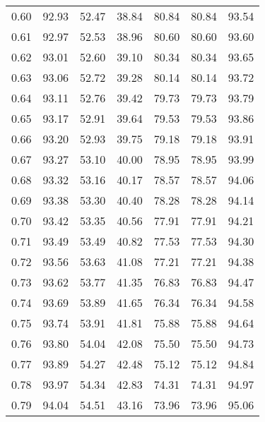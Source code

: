\begin{tabular}{|c|c|c|c|c|c|c|}
      0.60 &     92.93 &     52.47 &      38.84 &   80.84 &      80.84 &         93.54 \\
      0.61 &     92.97 &     52.53 &      38.96 &   80.60 &      80.60 &         93.60 \\
      0.62 &     93.01 &     52.60 &      39.10 &   80.34 &      80.34 &         93.65 \\
      0.63 &     93.06 &     52.72 &      39.28 &   80.14 &      80.14 &         93.72 \\
      0.64 &     93.11 &     52.76 &      39.42 &   79.73 &      79.73 &         93.79 \\
      0.65 &     93.17 &     52.91 &      39.64 &   79.53 &      79.53 &         93.86 \\
      0.66 &     93.20 &     52.93 &      39.75 &   79.18 &      79.18 &         93.91 \\
      0.67 &     93.27 &     53.10 &      40.00 &   78.95 &      78.95 &         93.99 \\
      0.68 &     93.32 &     53.16 &      40.17 &   78.57 &      78.57 &         94.06 \\
      0.69 &     93.38 &     53.30 &      40.40 &   78.28 &      78.28 &         94.14 \\
      0.70 &     93.42 &     53.35 &      40.56 &   77.91 &      77.91 &         94.21 \\
      0.71 &     93.49 &     53.49 &      40.82 &   77.53 &      77.53 &         94.30 \\
      0.72 &     93.56 &     53.63 &      41.08 &   77.21 &      77.21 &         94.38 \\
      0.73 &     93.62 &     53.77 &      41.35 &   76.83 &      76.83 &         94.47 \\
      0.74 &     93.69 &     53.89 &      41.65 &   76.34 &      76.34 &         94.58 \\
      0.75 &     93.74 &     53.91 &      41.81 &   75.88 &      75.88 &         94.64 \\
      0.76 &     93.80 &     54.04 &      42.08 &   75.50 &      75.50 &         94.73 \\
      0.77 &     93.89 &     54.27 &      42.48 &   75.12 &      75.12 &         94.84 \\
      0.78 &     93.97 &     54.34 &      42.83 &   74.31 &      74.31 &         94.97 \\
      0.79 &     94.04 &     54.51 &      43.16 &   73.96 &      73.96 &         95.06 \\

\end{tabular}

